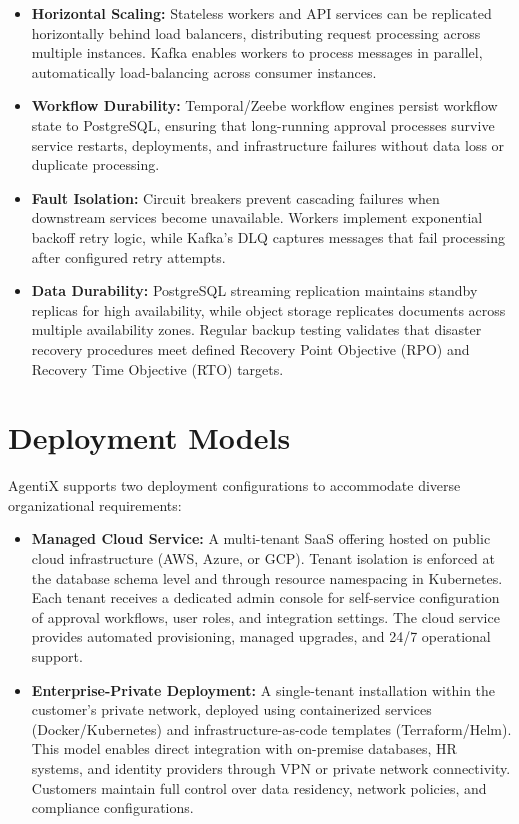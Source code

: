 \documentclass[12pt,oneside,openright,a4paper]{cpe-english-project}
\begin{document}
\begin{itemize}
\item \textbf{Horizontal Scaling:} Stateless workers and API services can be replicated horizontally behind load balancers, distributing request processing across multiple instances. Kafka enables workers to process messages in parallel, automatically load-balancing across consumer instances.

\item \textbf{Workflow Durability:} Temporal/Zeebe workflow engines persist workflow state to PostgreSQL, ensuring that long-running approval processes survive service restarts, deployments, and infrastructure failures without data loss or duplicate processing.

\item \textbf{Fault Isolation:} Circuit breakers prevent cascading failures when downstream services become unavailable. Workers implement exponential backoff retry logic, while Kafka's DLQ captures messages that fail processing after configured retry attempts.

\item \textbf{Data Durability:} PostgreSQL streaming replication maintains standby replicas for high availability, while object storage replicates documents across multiple availability zones. Regular backup testing validates that disaster recovery procedures meet defined Recovery Point Objective (RPO) and Recovery Time Objective (RTO) targets.
\end{itemize}

\vspace{1em}

\section{Deployment Models}

AgentiX supports two deployment configurations to accommodate diverse organizational requirements:

\begin{itemize}
\item \textbf{Managed Cloud Service:} A multi-tenant SaaS offering hosted on public cloud infrastructure (AWS, Azure, or GCP). Tenant isolation is enforced at the database schema level and through resource namespacing in Kubernetes. Each tenant receives a dedicated admin console for self-service configuration of approval workflows, user roles, and integration settings. The cloud service provides automated provisioning, managed upgrades, and 24/7 operational support.

\item \textbf{Enterprise-Private Deployment:} A single-tenant installation within the customer's private network, deployed using containerized services (Docker/Kubernetes) and infrastructure-as-code templates (Terraform/Helm). This model enables direct integration with on-premise databases, HR systems, and identity providers through VPN or private network connectivity. Customers maintain full control over data residency, network policies, and compliance configurations.
\end{itemize}
\end{document}
